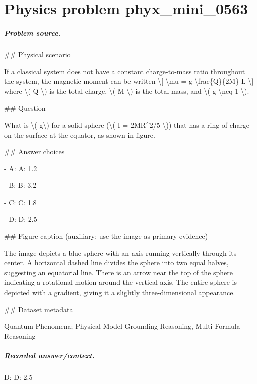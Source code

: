 
\chapter{Physics problem phyx\_mini\_0563}
\label{ch:PhyXMiniProblems_problem_phyx_mini_0563}

\paragraph{Problem source.}
\#\# Physical scenario

If a classical system does not have a constant charge-to-mass ratio throughout the system, the magnetic moment can be written
\textbackslash{}[ \textbackslash{}mu = g \textbackslash{}frac\{Q\}\{2M\} L \textbackslash{}]
where \textbackslash{}( Q \textbackslash{}) is the total charge, \textbackslash{}( M \textbackslash{}) is the total mass, and \textbackslash{}( g \textbackslash{}neq 1 \textbackslash{}).

\#\# Question

What is \textbackslash{}( g\textbackslash{}) for a solid sphere (\textbackslash{}( I = 2MR\textasciicircum{}2/5 \textbackslash{})) that has a ring of charge on the surface at the equator, as shown in figure.

\#\# Answer choices

- A: A: 1.2

- B: B: 3.2

- C: C: 1.8

- D: D: 2.5

\#\# Figure caption (auxiliary; use the image as primary evidence)

The image depicts a blue sphere with an axis running vertically through its center. A horizontal dashed line divides the sphere into two equal halves, suggesting an equatorial line. There is an arrow near the top of the sphere indicating a rotational motion around the vertical axis. The entire sphere is depicted with a gradient, giving it a slightly three-dimensional appearance.

\#\# Dataset metadata

Quantum Phenomena; Physical Model Grounding Reasoning, Multi-Formula Reasoning

\paragraph{Recorded answer/context.}
D: D: 2.5

